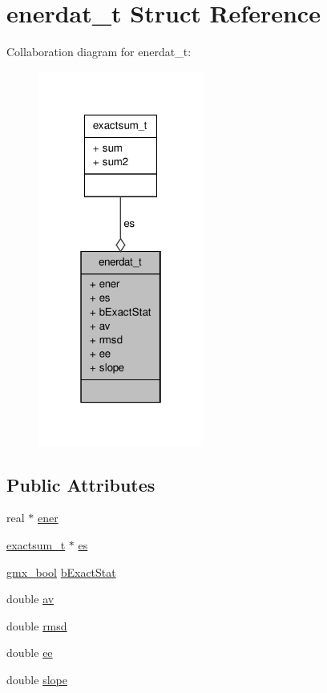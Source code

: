 \hypertarget{structenerdat__t}{\section{enerdat\-\_\-t \-Struct \-Reference}
\label{structenerdat__t}
}


\-Collaboration diagram for enerdat\-\_\-t\-:
\nopagebreak
\begin{figure}[H]
\begin{center}
\leavevmode
\includegraphics[width=154pt]{structenerdat__t__coll__graph}
\end{center}
\end{figure}
\subsection*{\-Public \-Attributes}
\begin{DoxyCompactItemize}
\item 
real $\ast$ \hyperlink{structenerdat__t_a834650bee926b1bec215d86a6acfb5ff}{ener}
\item 
\hyperlink{structexactsum__t}{exactsum\-\_\-t} $\ast$ \hyperlink{structenerdat__t_a8c0cc2277ca0f81699172692d25296a7}{es}
\item 
\hyperlink{include_2types_2simple_8h_a8fddad319f226e856400d190198d5151}{gmx\-\_\-bool} \hyperlink{structenerdat__t_ab18be0a43a4b8352b861cee2ee7a6b02}{b\-Exact\-Stat}
\item 
double \hyperlink{structenerdat__t_afee7c9789801163ff215554e658e6213}{av}
\item 
double \hyperlink{structenerdat__t_a5c9ea99e02c773fa0722139e3a5ae35d}{rmsd}
\item 
double \hyperlink{structenerdat__t_ad90a348426ab44dbf26f6b668f114e66}{ee}
\item 
double \hyperlink{structenerdat__t_ab944e034a27698f10029e1b35450bd32}{slope}
\end{DoxyCompactItemize}


